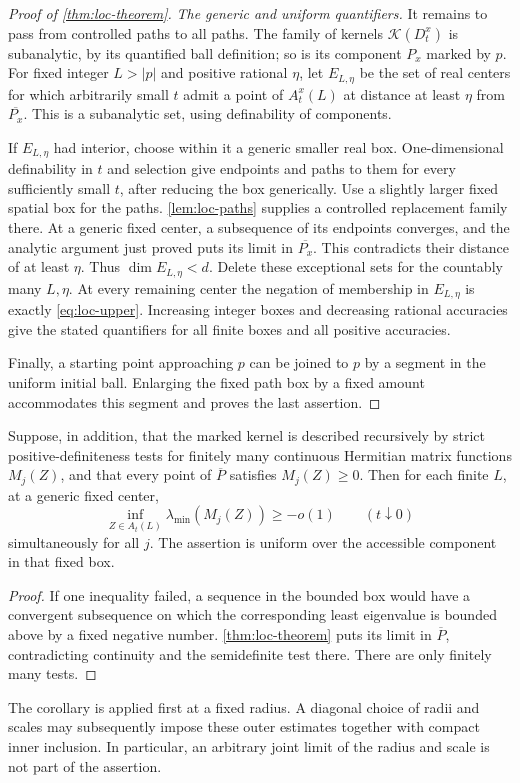 \begin{proof}[Proof of \cref{thm:loc-theorem}]
\emph{The generic and uniform quantifiers.} It remains to pass from controlled paths to all paths.  The family of kernels $\mathcal{K}(D_t^x)$ is subanalytic, by its quantified ball definition; so is its component $P_x$ marked by $p$.  For fixed integer $L>|p|$ and positive rational $\eta$, let $E_{L,\eta}$ be the set of real centers for which arbitrarily small $t$ admit a point of $A_t^x(L)$ at distance at least $\eta$ from $\overline{P_x}$. This is a subanalytic set, using definability of components.

If $E_{L,\eta}$ had interior, choose within it a generic smaller real box.  One-dimensional definability in $t$ and selection give endpoints and paths to them for every sufficiently small $t$, after reducing the box generically.  Use a slightly larger fixed spatial box for the paths.  \cref{lem:loc-paths} supplies a controlled replacement family there.  At a generic fixed center, a subsequence of its endpoints converges, and the analytic argument just proved puts its limit in $\overline{P_x}$.  This contradicts their distance of at least $\eta$. Thus $\dim E_{L,\eta}<d$.  Delete these exceptional sets for the countably many $L,\eta$.  At every remaining center the negation of membership in $E_{L,\eta}$ is exactly \eqref{eq:loc-upper}.  Increasing integer boxes and decreasing rational accuracies give the stated quantifiers for all finite boxes and all positive accuracies.

Finally, a starting point approaching $p$ can be joined to $p$ by a segment in the uniform initial ball.  Enlarging the fixed path box by a fixed amount accommodates this segment and proves the last assertion.
\end{proof}

\begin{corollary}\label{cor:loc-matrix-outer}
Suppose, in addition, that the marked kernel is described recursively by strict positive-definiteness tests for finitely many continuous Hermitian matrix functions $M_j(Z)$, and that every point of $\overline P$ satisfies $M_j(Z)\geq0$.  Then for each finite $L$, at a generic fixed center,
\[
 \inf_{Z\in A_t(L)}\lambda_{\min}(M_j(Z))\geq-o(1)
                \qquad(t\downarrow0)
\]
simultaneously for all $j$.  The assertion is uniform over the accessible component in that fixed box.
\end{corollary}

\begin{proof}
If one inequality failed, a sequence in the bounded box would have a convergent subsequence on which the corresponding least eigenvalue is bounded above by a fixed negative number.  \cref{thm:loc-theorem} puts its limit in $\overline P$, contradicting continuity and the semidefinite test there.  There are only finitely many tests.
\end{proof}

The corollary is applied first at a fixed radius.  A diagonal choice of radii and scales may subsequently impose these outer estimates together with compact inner inclusion.  In particular, an arbitrary joint limit of the radius and scale is not part of the assertion.
